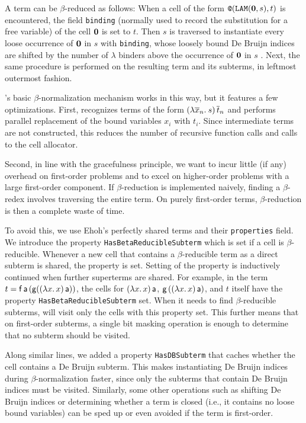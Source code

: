 A term can be $\beta$-reduced as follows: When a cell of the
form $ \texttt{@}(\texttt{LAM}(\mathbf{0}, s),t)$ is encountered, the field
\texttt{binding} (normally used to record the substitution for a free variable) of the
cell $\mathbf{0}$ is set to $t$. Then $s$ is traversed to instantiate every
loose occurrence of $\mathbf{0}$ in $s$ with \texttt{binding}, whose loosely
bound De Bruijn indices are shifted by the number of $\lambda$ binders above
the occurrence of $\mathbf{0}$ in $s$ \cite{fk-01-deBruijn}. Next, the same
procedure is performed on the resulting term and its subterms, in
leftmost outermost fashion.

\ehohii{}'s basic $\beta$-normalization mechanism works in this way, but it
features a few optimizations.
First, \ehohii{} recognizes terms of the form $(\lambda \overline{x}_n.\> s) \,\overline{t}_n$ 
and performs parallel replacement of the bound variables $x_i$ with
$t_i$. Since intermediate terms are not constructed, this reduces the number of
recursive function calls and calls to the cell allocator.

Second, in line with the gracefulness principle, we want \ehohii{} to incur
little (if any) overhead on first-order problems and to
excel on higher-order problems with a large first-order component. If
$\beta$-reduction is implemented naively, finding a $\beta$-redex involves
traversing the entire term. On purely first-order terms, $\beta$-reduction
is then a complete waste of time.

To avoid this, we use Ehoh's perfectly shared
terms and their \texttt{properties} field.
%
We introduce the property \texttt{HasBetaReducibleSubterm} which is set if
a cell is $\beta$-reducible.
Whenever a new cell that contains a
$\beta$-reducible term as a direct subterm is shared, the property is set.
Setting of the property is inductively continued when further superterms are
shared. For example, in the term $t = \mathsf{f} \, \mathsf{a} \, (\mathsf{g} ((\lambda x.\,
x)\,\mathsf{a}))$, the cells for $(\lambda x.\, x)\,\mathsf{a}$,
$\mathsf{g}\,((\lambda x.\, x)\,\mathsf{a})$, and $t$ itself have the property
\texttt{HasBetaReducibleSubterm} set.
%
When it needs to find $\beta$-reducible subterms, \ehohii{} will visit only the
cells with this property set. This further means that on first-order
subterms, a single bit masking operation is enough to determine that no subterm
should be visited.

Along similar lines, we added a property \texttt{HasDBSubterm} that
caches whether the cell contains a De Bruijn subterm. This
makes
instantiating De Bruijn indices during $\beta$-normalization faster, since only the
subterms that contain De Bruijn indices must be visited. Similarly, some other
operations such as shifting De Bruijn indices or determining whether a term is closed
(i.e., it contains no loose bound variables) can be sped up or even avoided
if the term is first-order.

